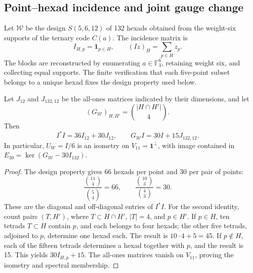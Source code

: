 \subsection{Point--hexad incidence and joint gauge change}

Let \(\mathcal W\) be the design \(S(5,6,12)\) of 132 hexads obtained
from the weight-six supports of the ternary code \(C(a)\). The incidence
matrix is
\[
 I_{H,p}=\mathbf1_{p\in H},\qquad
 (Iz)_H=\sum_{p\in H}z_p.
\]
The blocks are reconstructed by enumerating \(a\in\mathbb F_3^6\),
retaining weight six, and collecting equal supports. The finite
verification that each five-point subset belongs to a unique
hexad fixes the design property used below.

\begin{lemma}
\label{ii:lem:ii-witt-incidence-identities}
Let \(J_{12}\) and \(J_{132,12}\) be the all-ones matrices indicated by
their dimensions, and let
\[
 (G_{\mathcal W})_{H,H'}=\binom{|H\cap H'|}{4}.
\]
Then
\begin{equation}
 I^*I=36I_{12}+30J_{12},\qquad
 G_{\mathcal W}I=30I+15J_{132,12}.
 \label{ii:eq:ii-witt-incidence-identities}
\end{equation}
In particular, \(U_W=I/6\) is an isometry on
\(V_{11}=\mathbf1^\perp\), with image contained in
\(E_{30}=\ker(G_{\mathcal W}-30I_{132})\).
\end{lemma}
\begin{proof}
The design property gives 66 hexads per point and 30 per pair of points:
\[
 \frac{\binom{11}{4}}{\binom54}=66,
 \qquad \frac{\binom{10}{3}}{\binom43}=30.
\]
These are the diagonal and off-diagonal entries of \(I^*I\).
For the second identity, count pairs \((T,H')\), where
\(T\subset H\cap H'\), \(|T|=4\), and \(p\in H'\).
If \(p\in H\), ten tetrads \(T\subset H\) contain \(p\),
and each belongs to four hexads; the other five tetrads,
adjoined to \(p\), determine one hexad each. The result is
\(10\cdot4+5=45\). If \(p\notin H\), each of the fifteen
tetrads determines a hexad together with \(p\), and the result is 15.
This yields \(30I_{H,p}+15\). The all-ones matrices vanish on
\(V_{11}\), proving the isometry and spectral membership.
\end{proof}

